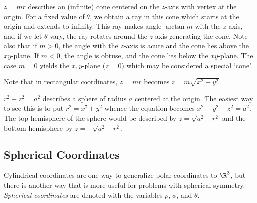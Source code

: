 \begin{example}  $z = mr$  describes an (infinite)
  cone centered
on the $z$-axis with vertex at the origin.  For a fixed value
of $\theta$, we obtain a ray in this cone which starts at
the origin and extends to infinity.  This ray makes angle
$\arctan m$ with the $z$-axis, and if we let $\theta$
vary, the ray rotates around the $z$-axis generating the
cone.  Note also that if $m > 0$, the angle with the $z$-axis
is acute and the cone lies above the $xy$-plane.  If
$m < 0$, the angle is obtuse, and the cone lies below the
$xy$-plane.  The case $m = 0$ yields the $x,y$-plane
($z = 0$) which may be considered a special `cone'.

Note that in rectangular coordinates,  $z = mr$ becomes
$z = m\sqrt{x^2 + y^2}$.

	\begin{center}
	\end{center}
\end{example}

\begin{example}  $r^2 + z^2 = a^2$ describes a sphere
of radius $a$ centered at the origin.  The easiest way to
see this is to put $r^2 = x^2 + y^2$ whence the equation
becomes $x^2 + y^2 + z^2 = a^2$.  The top hemisphere of the
sphere would be described by $z = \sqrt{a^2 - r^2}$
and the bottom hemisphere by
 $z = -\sqrt{a^2 - r^2}$.
\end{example}


\subsection{Spherical Coordinates}

Cylindrical coordinates are one way to generalize polar coordinates
to $\R^3$, but there is another way that is more useful for
problems with spherical symmetry. 
\emph{Spherical
coordinates}
are denoted with the variables $\rho$, $\phi$, and $\theta$.

